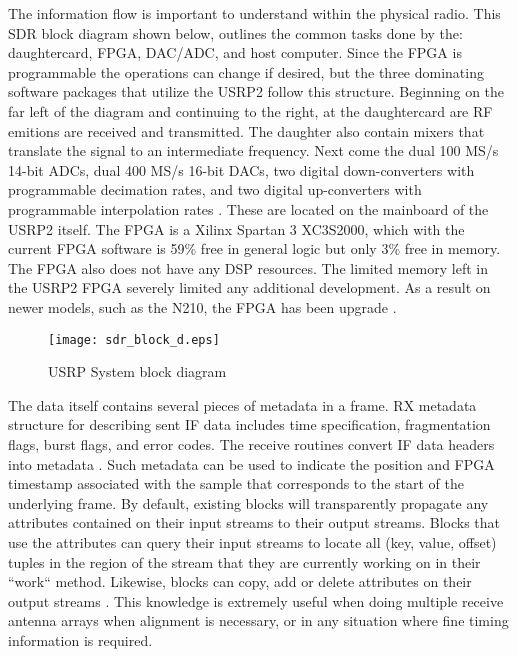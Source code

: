 The information flow is important to understand within the physical radio.  This SDR block diagram shown below, outlines the common tasks done by the: daughtercard, FPGA, DAC/ADC, and host computer.  Since the FPGA is programmable the operations can change if desired, but the three dominating software packages that utilize the USRP2 follow this structure.  Beginning on the far left of the diagram and continuing to the right, at the daughtercard are RF emitions are received and transmitted.  The daughter also contain mixers that translate the signal to an intermediate frequency.  Next come the dual 100 MS/s 14-bit ADCs, dual 400 MS/s 16-bit DACs, two digital down-converters with programmable decimation rates, and two digital up-converters with programmable interpolation rates \cite{USRP2Stats}.  These are located on the mainboard of the USRP2 itself.  The FPGA is a Xilinx Spartan 3 XC3S2000, which with the current FPGA software is 59\% free in general logic but only 3\% free in memory.  The FPGA also does not have any DSP resources.  The limited memory left in the USRP2 FPGA severely limited any additional development.  As a result on newer models, such as the N210, the FPGA has been upgrade \cite{n210spec}.\\

\begin{figure}[!ht]
\centering
\texttt{[image: sdr\_block\_d.eps]}
\caption{USRP System block diagram\cite{sdr_blocks}}
\end{figure}

The data itself contains several pieces of metadata in a frame.  RX metadata structure for describing sent IF data includes time specification, fragmentation flags, burst flags, and error codes. The receive routines convert IF data headers into metadata \cite{metadata}.  Such metadata can be used to indicate the position and FPGA timestamp associated with the sample that corresponds to the start of the underlying frame. By default, existing blocks will transparently propagate any attributes contained on their input streams to their output streams. Blocks that use the attributes can query their input streams to locate all (key, value, offset) tuples in the region of the stream that they are currently working on in their ``work`` method. Likewise, blocks can copy, add or delete attributes on their output streams \cite{sdr_blog}.  This knowledge is extremely useful when doing multiple receive antenna arrays when alignment is necessary, or in any situation where fine timing information is required.\\

